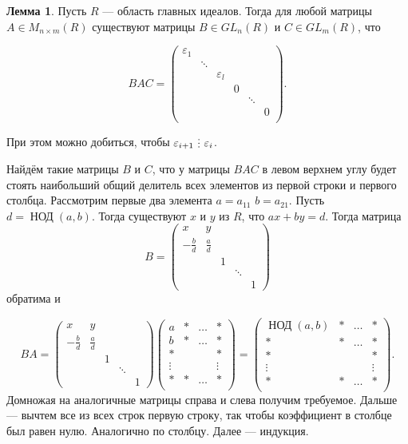 \documentclass[10pt,a4paper,oneside]{book}
\theoremstyle{definition}
\newtheorem{lem}{Лемма}
\newcommand{\di}{\mathop{\,\scalebox{0.85}{\raisebox{-1.2pt}[0.5\height]{\vdots}}\,}}
\newcommand{\Nod}{\operatorname{\text{НОД}}}
\def\eps{\varepsilon}
\begin{document}
\begin{lem}
Пусть $R$ --- область главных идеалов. Тогда для любой матрицы $A\in M_{n\times m} (R)$ существуют матрицы $B\in GL_n(R)$ и $C\in GL_m(R)$, что 

$$BAC=\begin{pmatrix}
\eps_1& & & & & \\
& \ddots& & & &\\
& &  \eps_l& & & \\
&  & & 0& & \\
&& & &\ddots & \\
& & & & & 0\\
\end{pmatrix}.$$

При этом можно добиться, чтобы $\eps_{i+1} \di \eps_i$.


\proof
Найдём такие матрицы $B$ и $C$, что у матрицы $BAC$ в левом верхнем углу будет стоять наибольший общий делитель всех элементов из первой строки и первого столбца. Рассмотрим первые два элемента $a=a_{11}$ $b=a_{21}$. Пусть $d=\Nod(a,b)$. Тогда существуют $x$ и $y$ из $R$, что $ax+by=d$. Тогда матрица 
$$ B= \begin{pmatrix}
x & y & & &  \\
-\frac{b}{d}  & \frac{a}{d}& & & \\
& &  1& &  \\
&  & & \ddots&  \\
&& & &1
\end{pmatrix} $$
 обратима и 

$$BA= \begin{pmatrix}
x & y & & &  \\
-\frac{b}{d}  & \frac{a}{d}& & & \\
& &  1& &  \\
&  & & \ddots&  \\
&& & &1
\end{pmatrix}\begin{pmatrix}
a& *&\dots & * \\
b& *&\dots & * \\
*& &  & *\\
\vdots &  & &   \vdots\\
*&*& \dots &   *\\
\end{pmatrix} =
\begin{pmatrix}
\Nod(a,b) & *&\dots & * \\
*& *&\dots & * \\
*& &  & *\\
\vdots &  & &   \vdots\\
*&*& \dots &   *\\
\end{pmatrix}. $$
Домножая на аналогичные матрицы справа и слева получим требуемое. Дальше --- вычтем все из всех строк первую строку, так чтобы коэффициент в столбце был равен нулю. Аналогично по столбцу. Далее --- индукция.
\endproof
\end{lem}
\end{document}
